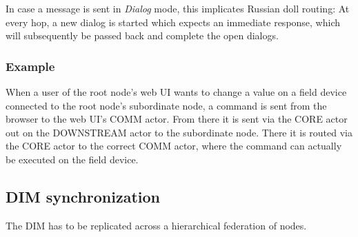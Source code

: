In case a message is sent in \emph{Dialog} mode, this implicates Russian doll
routing: At every hop, a new dialog is started which expects an immediate
response, which will subsequently be passed back and complete the open dialogs.


%
%

%


\subsubsection{Example}
When a user of the root node's web UI wants to change a value on a field device
connected to the root node's subordinate node, a command is sent from the
browser to the web UI's COMM actor. From there it is sent via the CORE actor out
on the DOWNSTREAM actor to the subordinate node. There it is routed
via the CORE actor to the correct COMM actor, where the command can actually be
executed on the field device.


\subsection{DIM synchronization}
The DIM has to be replicated across a hierarchical federation of nodes.

